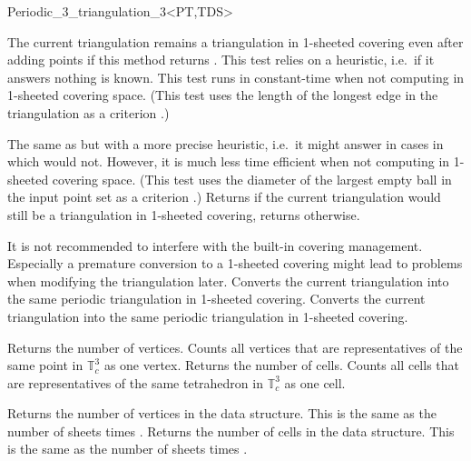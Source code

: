 \begin{ccRefClass}{Periodic_3_triangulation_3<PT,TDS>}
\begin{ccAdvanced}
{The current triangulation remains a triangulation in 1-sheeted
  covering even after adding points if this method returns
  . This test relies on a heuristic, i.e.\ if it answers
   nothing is known. This test runs in constant-time when
  not computing in 1-sheeted covering space. (This test uses the length
of the longest edge in the triangulation as a
criterion \cite{cgal:ct-c3dpt-09}.)}

{The same as  but with
a more precise heuristic, i.e.\ it might answer  in cases in which
 would not. However, it is
much less time efficient when not computing in 1-sheeted covering
space. (This test uses the diameter of the largest empty ball in the
input point set as a criterion \cite{cgal:ct-c3dpt-09}.)}
\ccGlue
{}
{Returns  if the current triangulation would still be a
  triangulation in 1-sheeted covering, returns  otherwise.}

It is not recommended to interfere with the built-in covering
management. Especially a premature conversion to a 1-sheeted covering
might lead to problems when modifying the triangulation later.
{Converts the current triangulation into the same periodic
  triangulation in 1-sheeted covering.}
\ccGlue
{}
{Converts the current triangulation into the same periodic
  triangulation in 1-sheeted covering.}

\end{ccAdvanced}


{Returns the number of vertices. Counts all vertices that are
  representatives of the same point in $\mathbb T_c^3$ as one vertex.}
\ccGlue
{}
{Returns the number of cells. Counts all cells that are
  representatives of the same tetrahedron in $\mathbb T_c^3$ as one
  cell.}

\begin{ccAdvanced}
{Returns the number of vertices in the data structure. This is the
  same as the number of sheets times . }
\ccGlue
{}
{Returns the number of cells in the data structure. This is the same
  as the number of sheets times .}
\end{ccAdvanced}


\end{ccRefClass}
